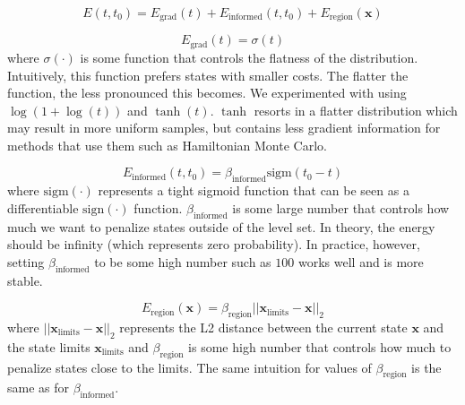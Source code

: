 \documentclass[letterpaper, 10 pt, conference]{ieeeconf}  %
\begin{document}
{\begin{equation}
E\left(t, t_0\right) = E_{\text{grad}}\left(t\right) + E_{\text{informed}}\left(t,t_0\right) + E_{\text{region}}\left(\mathbf{x}\right)
\end{equation}

\begin{equation}
E_{\text{grad}}\left(t\right) = \sigma\left(t\right)
\end{equation}
where $\sigma\left(\cdot\right)$ is some function that controls the flatness of the distribution.  Intuitively, this function prefers states with smaller costs. The flatter the function, the less pronounced this becomes. We experimented with using $\log\left(1 + \log\left(t\right)\right)$ and $\tanh\left(t\right)$. $\tanh$ resorts in a flatter distribution which may result in more uniform samples, but contains less gradient information for methods that use them such as Hamiltonian Monte Carlo.

\begin{equation}
E_{\text{informed}}\left(t,t_0\right) = \beta_{\text{informed}} \text{sigm}\left(t_0 - t\right)
\end{equation}
where $\text{sigm}\left(\cdot\right)$ represents a tight sigmoid function that can be seen as a differentiable $\text{sign}\left(\cdot\right)$ function. $\beta_{\text{informed}}$ is some large number that controls how much we want to penalize states outside of the level set. In theory, the energy should be infinity (which represents zero probability). In practice, however, setting $\beta_{\text{informed}}$ to be some high number such as $100$ works well and is more stable.

\begin{equation}
E_{\text{region}}\left(\mathbf{x}\right) = \beta_{\text{region}}||\mathbf{x}_{\text{limits}} - \mathbf{x}||_2
\end{equation}
where $||\mathbf{x}_{\text{limits}} - \mathbf{x}||_2$ represents the L2 distance between the current state $\mathbf{x}$ and the state limits $\mathbf{x}_{\text{limits}}$ and $\beta_{\text{region}}$ is some high number that controls how much to penalize states close to the limits. The same intuition for values of $\beta_{\text{region}}$ is the same as for $\beta_{\text{informed}}$.

}








%
\end{document}
